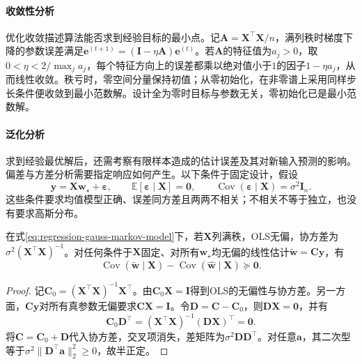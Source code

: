 \paragraph{收敛性分析}
优化收敛描述算法能否求到经验目标的最小点。记$\bm{A}=\bm{X}^{\top}\bm{X}/n$，满列秩时梯度下降的参数误差满足$\bm{e}^{(t+1)}=(\bm{I}-\eta\bm{A})\bm{e}^{(t)}$。若$\bm{A}$的特征值为$a_j>0$，取$0<\eta<2/\max_j a_j$，每个特征方向上的误差都乘以绝对值小于$1$的因子$1-\eta a_j$，从而线性收敛。秩亏时，零空间分量保持初值；从零初始化，在非零谱上采用同样步长条件便收敛到最小范数解。设计全为零时目标与参数无关，零初始化已是最小范数解。

\paragraph{泛化分析}
求到经验最优解后，还需考察有限样本造成的估计误差及其对新输入预测的影响。偏差与方差分析需要指定响应如何产生。以下条件于固定设计，假设
\begin{equation}
  \bm{y}=\bm{X}\bm{w}_{\star}+\bm{\varepsilon},\qquad
  \mathbb{E}[\bm{\varepsilon}\mid\bm{X}]=\bm{0},\qquad
  \operatorname{Cov}(\bm{\varepsilon}\mid\bm{X})=\sigma^2\bm{I}_n.
  \label{eq:regression-gauss-markov-model}
\end{equation}
这些条件要求均值模型正确、误差同方差且两两不相关；不相关不等于独立，也没有要求高斯分布。

\begin{theorem}
  \label{thm:regression-gauss-markov}
  在式\eqref{eq:regression-gauss-markov-model}下，若$\bm{X}$列满秩，OLS无偏，协方差为$\sigma^2(\bm{X}^{\top}\bm{X})^{-1}$。对任何条件于$\bm{X}$固定、对所有$\bm{w}_{\star}$均无偏的线性估计$\widetilde{\bm{w}}=\bm{C}\bm{y}$，有
  \[
    \operatorname{Cov}(\widetilde{\bm{w}}\mid\bm{X})
    -\operatorname{Cov}(\widehat{\bm{w}}\mid\bm{X})\succeq\bm{0}.
  \]
\end{theorem}

\begin{proof}
记$\bm{C}_0=(\bm{X}^{\top}\bm{X})^{-1}\bm{X}^{\top}$。由$\bm{C}_0\bm{X}=\bm{I}$得到OLS的无偏性与协方差。另一方面，$\bm{C}\bm{y}$对所有真参数无偏要求$\bm{C}\bm{X}=\bm{I}$。令$\bm{D}=\bm{C}-\bm{C}_0$，则$\bm{D}\bm{X}=\bm{0}$，并有
\[
  \bm{C}_0\bm{D}^{\top}
  =(\bm{X}^{\top}\bm{X})^{-1}(\bm{D}\bm{X})^{\top}=\bm{0}.
\]
将$\bm{C}=\bm{C}_0+\bm{D}$代入协方差，交叉项消失，差矩阵为$\sigma^2\bm{D}\bm{D}^{\top}$。对任意$\bm{a}$，其二次型等于$\sigma^2\lVert\bm{D}^{\top}\bm{a}\rVert_2^2\geq0$，故半正定。
\end{proof}

